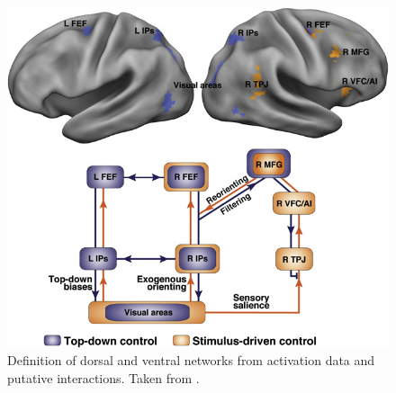 \documentclass[a4paper, 12pt]{scrreprt}
\begin{document}
\begin{figure}
	\includegraphics[scale=0.4]{img/attentionnetworks.png}
	\caption[Dorsal and ventral attention networks]
	{\small{Definition of dorsal and ventral networks from activation data and putative interactions. Taken from \textcite{corbetta2008reorienting}.}}
	\label{fig:Networks}
\end{figure}
\end{document}

